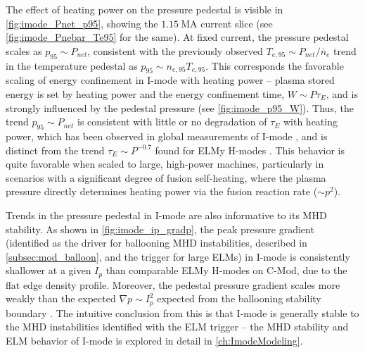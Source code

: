 \begin{figure}[t]
 \pushtooutside
\end{figure}

The effect of heating power on the pressure pedestal is visible in \cref{fig:imode_Pnet_p95}, showing the $\SI{1.15}{\mega\ampere}$ current slice (see \cref{fig:imode_Pnebar_Te95} for the same).  At fixed current, the pressure pedestal scales as $p_{95} \sim P_{net}$, consistent with the previously observed $T_{e,95} \sim P_{net}/\overline{n}_e$ trend in the temperature pedestal as $p_{95} \sim n_{e,95} T_{e,95}$.  This corresponds the favorable scaling of energy confinement in I-mode with heating power -- plasma stored energy is set by heating power and the energy confinement time, $W \sim P \tau_E$, and is strongly influenced by the pedestal pressure (see \cref{fig:imode_p95_W}).  Thus, the trend $p_{95} \sim P_{net}$ is consistent with little or no degradation of $\tau_E$ with heating power, which has been observed in global measurements of I-mode \cite{Dominguez2012,Whyte2010}, and is distinct from the trend $\tau_E \sim P^{-0.7}$ found for ELMy H-modes \cite{ITER1999}.  This behavior is quite favorable when scaled to large, high-power machines, particularly in scenarios with a significant degree of fusion self-heating, where the plasma pressure directly determines heating power via the fusion reaction rate ($\sim p^2$).

Trends in the pressure pedestal in I-mode are also informative to its MHD stability.  As shown in \cref{fig:imode_ip_gradp}, the peak pressure gradient (identified as the driver for ballooning MHD instabilities, described in \cref{subsec:mod_balloon}, and the trigger for large ELMs) in I-mode is consistently shallower at a given $I_p$ than comparable ELMy H-modes on C-Mod, due to the flat edge density profile.  Moreover, the pedestal pressure gradient scales more weakly than the expected $\nabla p \sim I_p^2$ expected from the ballooning stability boundary \cite{Connor1978}.  The intuitive conclusion from this is that I-mode is generally stable to the MHD instabilities identified with the ELM trigger -- the MHD stability and ELM behavior of I-mode is explored in detail in \cref{ch:ImodeModeling}.\nicesectionending

